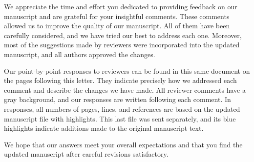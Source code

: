 We appreciate the time and effort you dedicated to providing feedback on our manuscript and are grateful for your insightful comments. These comments allowed us to improve the quality of our manuscript. All of them have been carefully considered, and we have tried our best to address each one. Moreover, most of the suggestions made by reviewers were incorporated into the updated manuscript, and all authors approved the changes.

Our point-by-point responses to reviewers can be found in this same document on the pages following this letter. They indicate precisely how we addressed each comment and describe the changes we have made. All reviewer comments have a gray background, and our responses are written following each comment. In responses, all numbers of pages, lines, and references are based on the updated manuscript file with highlights. This last file was sent separately, and its blue highlights indicate additions made to the original manuscript text.

We hope that our answers meet your overall expectations and that you find the updated manuscript after careful revisions satisfactory.